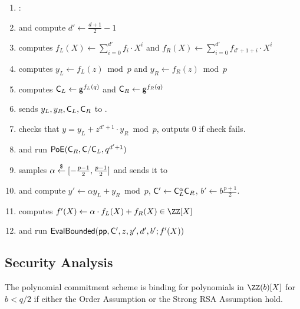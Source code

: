 \begin{mdframed}
\begin{minipage}{\textwidth}
\begin{enumerate}[nolistsep]
        \item \pcelse: 
       
        \item \pcind[1] \prover and \verifier compute $d' \gets \frac{d+1}{2} - 1$
        \item \pcind[1] \prover computes $f_L(X) \gets \sum\limits_{i=0}^{d'} f_i \cdot X^i$ and $f_R(X)\gets\sum\limits_{i=0}^{d'} f_{d'+1+i}\cdot X^{i}$
        \item \pcind[1] \prover computes $y_L\gets f_L(z) \bmod p$ and $y_R\gets f_R(z)\bmod p$
        \item \pcind[1] \prover computes $\mathsf{C}_L \gets \mathsf{g}^{f_L(q)}$ and $\mathsf{C}_R \gets \mathsf{g}^{f_R(q)}$
        \item \pcind[1] \prover sends $y_L,y_R, \mathsf{C}_L, \mathsf{C}_R$ to \verifier. 
        \item \pcind[1] \verifier checks that $y=y_L+z^{d'+1}\cdot y_R \bmod p$, outputs $0$ if check fails.
        \item \pcind[1] \label{line:PoE} \prover and \verifier run $\textsf{{PoE}}(\mathsf{C}_R, \mathsf{C}/\mathsf{C}_L, q^{d'+1})$
        \item \pcind[1] \verifier samples $\alpha \overset{\$}{\gets} [-\frac{p-1}{2},\frac{p-1}{2}]$ and sends it to \prover
        \item \pcind[1] \prover and \verifier compute $y'\gets\alpha  y_L +y_R \bmod p$, $\mathsf{C}' \gets \mathsf{C}_L^\alpha  \mathsf{C}_R$, $b'\gets b \frac{p+1}{2}$. 
        \item \pcind[1] \prover computes $f'(X) \gets \alpha \cdot f_L(X) + f_R(X) \in \ZZ[X]$ 
        \item \pcind[1] \prover and \verifier run $\textsf{{EvalBounded}}(\textsf{pp}, \mathsf{C}', z, y', d',b' ; f'(X))$
               \end{enumerate}
      \end{minipage}
\end{mdframed}


\begin{comment}
\end{comment}

\subsection{Security Analysis} 
 \newcommand{\bindinglemma}{
 The polynomial commitment scheme is binding for polynomials in $\ZZ(b)[X]$ for $b<q/2$ if either the Order Assumption or the Strong RSA Assumption hold.
	}
\begin{lemma}
\label{lem:binding}
	\bindinglemma
	\end{lemma}

